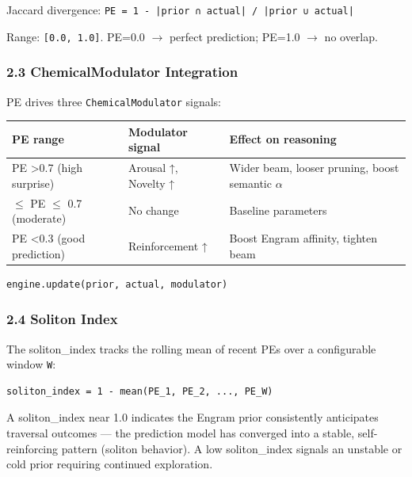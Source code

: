 Jaccard divergence: \texttt{PE = 1 - |prior ∩ actual| / |prior ∪ actual|}

Range: \texttt{[0.0, 1.0]}. PE=0.0 $\to$ perfect prediction; PE=1.0 $\to$ no overlap.

\subsubsection{2.3 ChemicalModulator Integration}

PE drives three \texttt{ChemicalModulator} signals:

\begin{center}
{\footnotesize
\begin{tabularx}{\columnwidth}{|>{\raggedright\arraybackslash}X|>{\raggedright\arraybackslash}X|>{\raggedright\arraybackslash}X|}
\hline
PE range & Modulator signal & Effect on reasoning \\ \hline
PE \textgreater  0.7 (high surprise) & Arousal ↑, Novelty ↑ & Wider beam, looser pruning, boost semantic $\alpha$ \\ \hline
0.3 $\le$ PE $\le$ 0.7 (moderate) & No change & Baseline parameters \\ \hline
PE \textless  0.3 (good prediction) & Reinfo\-rcement ↑ & Boost Engram affinity, tighten beam \\ \hline
\end{tabularx}
}
\end{center}

\begin{lstlisting}
engine.update(prior, actual, modulator)
\end{lstlisting}

\subsubsection{2.4 Soliton Index}

The soliton\_index tracks the rolling mean of recent PEs over a confi\-gurable window \texttt{W}:

\begin{lstlisting}
soliton_index = 1 - mean(PE_1, PE_2, ..., PE_W)
\end{lstlisting}

A soliton\_index near 1.0 indicates the Engram prior consi\-stently anticipates traversal outcomes — the prediction model has converged into a stable, self-reinforcing pattern (soliton behavior). A low soliton\_index signals an unstable or cold prior requiring continued exploration.

